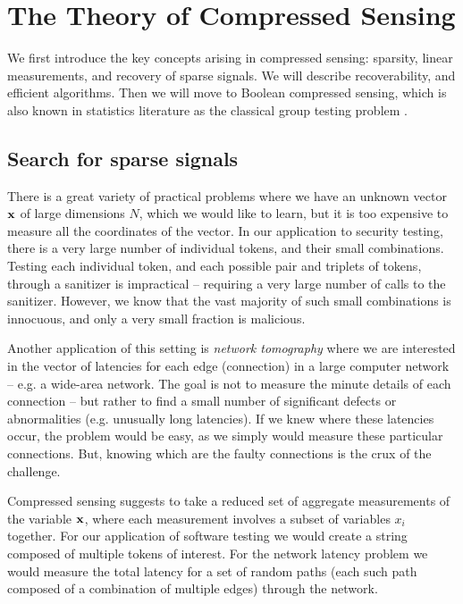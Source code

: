 \section{The Theory of Compressed Sensing}

We first introduce the key concepts arising in compressed sensing: sparsity, 
linear measurements, and recovery of sparse signals. We will describe recoverability, 
and efficient algorithms. Then we will move to Boolean compressed sensing, which is 
also known in statistics literature as the classical group testing problem \cite{group_testing}.

\subsection{Search for sparse signals}

There is a great variety of practical problems where we have an unknown vector $\mathbf{x}$
of large dimensions $N$, which we would like to learn, but it is too expensive to measure all 
the coordinates of the vector. In our application to security testing, there is a very large
number of individual tokens, and their small combinations. Testing each individual token, and 
each possible pair and triplets of tokens, through a sanitizer is impractical -- requiring a 
very large number of calls to the sanitizer. However, we know that the vast majority of such 
small combinations is innocuous, and only a very small fraction is malicious. 

Another application of this setting is {\em network tomography} \cite{network_tomography} 
where we are interested in the vector of latencies for each edge (connection) in a large 
computer network -- e.g. 
a wide-area network. The goal is not to measure the minute details of each connection -- but
rather to find a small number of significant defects or abnormalities (e.g. unusually long 
latencies). If we knew where these latencies occur, the problem would be easy, as we simply 
would measure these particular connections. But, knowing which are the faulty connections is 
the crux of the challenge. 

Compressed sensing suggests to take a reduced set of aggregate measurements of the variable $\mathbf{x}$, 
where each measurement involves a subset of variables $x_i$ together.  For our application of 
software testing we would create a string composed of multiple tokens of interest.  For the 
network latency problem we would measure the total latency for a set of random paths (each such 
path composed of a combination of multiple edges) through the network. 


